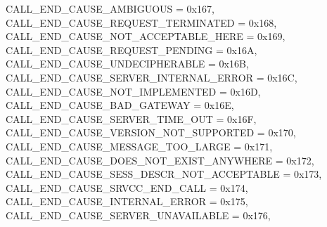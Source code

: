 \begin{DoxyItemize}
 C\+A\+L\+L\+\_\+\+E\+N\+D\+\_\+\+C\+A\+U\+S\+E\+\_\+\+A\+M\+B\+I\+G\+U\+O\+US = 0x167,~\newline
 C\+A\+L\+L\+\_\+\+E\+N\+D\+\_\+\+C\+A\+U\+S\+E\+\_\+\+R\+E\+Q\+U\+E\+S\+T\+\_\+\+T\+E\+R\+M\+I\+N\+A\+T\+ED = 0x168,~\newline
 C\+A\+L\+L\+\_\+\+E\+N\+D\+\_\+\+C\+A\+U\+S\+E\+\_\+\+N\+O\+T\+\_\+\+A\+C\+C\+E\+P\+T\+A\+B\+L\+E\+\_\+\+H\+E\+RE = 0x169,~\newline
 C\+A\+L\+L\+\_\+\+E\+N\+D\+\_\+\+C\+A\+U\+S\+E\+\_\+\+R\+E\+Q\+U\+E\+S\+T\+\_\+\+P\+E\+N\+D\+I\+NG = 0x16A,~\newline
 C\+A\+L\+L\+\_\+\+E\+N\+D\+\_\+\+C\+A\+U\+S\+E\+\_\+\+U\+N\+D\+E\+C\+I\+P\+H\+E\+R\+A\+B\+LE = 0x16B,~\newline
 C\+A\+L\+L\+\_\+\+E\+N\+D\+\_\+\+C\+A\+U\+S\+E\+\_\+\+S\+E\+R\+V\+E\+R\+\_\+\+I\+N\+T\+E\+R\+N\+A\+L\+\_\+\+E\+R\+R\+OR = 0x16C,~\newline
 C\+A\+L\+L\+\_\+\+E\+N\+D\+\_\+\+C\+A\+U\+S\+E\+\_\+\+N\+O\+T\+\_\+\+I\+M\+P\+L\+E\+M\+E\+N\+T\+ED = 0x16D,~\newline
 C\+A\+L\+L\+\_\+\+E\+N\+D\+\_\+\+C\+A\+U\+S\+E\+\_\+\+B\+A\+D\+\_\+\+G\+A\+T\+E\+W\+AY = 0x16E,~\newline
 C\+A\+L\+L\+\_\+\+E\+N\+D\+\_\+\+C\+A\+U\+S\+E\+\_\+\+S\+E\+R\+V\+E\+R\+\_\+\+T\+I\+M\+E\+\_\+\+O\+UT = 0x16F,~\newline
 C\+A\+L\+L\+\_\+\+E\+N\+D\+\_\+\+C\+A\+U\+S\+E\+\_\+\+V\+E\+R\+S\+I\+O\+N\+\_\+\+N\+O\+T\+\_\+\+S\+U\+P\+P\+O\+R\+T\+ED = 0x170,~\newline
 C\+A\+L\+L\+\_\+\+E\+N\+D\+\_\+\+C\+A\+U\+S\+E\+\_\+\+M\+E\+S\+S\+A\+G\+E\+\_\+\+T\+O\+O\+\_\+\+L\+A\+R\+GE = 0x171,~\newline
 C\+A\+L\+L\+\_\+\+E\+N\+D\+\_\+\+C\+A\+U\+S\+E\+\_\+\+D\+O\+E\+S\+\_\+\+N\+O\+T\+\_\+\+E\+X\+I\+S\+T\+\_\+\+A\+N\+Y\+W\+H\+E\+RE = 0x172,~\newline
 C\+A\+L\+L\+\_\+\+E\+N\+D\+\_\+\+C\+A\+U\+S\+E\+\_\+\+S\+E\+S\+S\+\_\+\+D\+E\+S\+C\+R\+\_\+\+N\+O\+T\+\_\+\+A\+C\+C\+E\+P\+T\+A\+B\+LE = 0x173,~\newline
 C\+A\+L\+L\+\_\+\+E\+N\+D\+\_\+\+C\+A\+U\+S\+E\+\_\+\+S\+R\+V\+C\+C\+\_\+\+E\+N\+D\+\_\+\+C\+A\+LL = 0x174,~\newline
 C\+A\+L\+L\+\_\+\+E\+N\+D\+\_\+\+C\+A\+U\+S\+E\+\_\+\+I\+N\+T\+E\+R\+N\+A\+L\+\_\+\+E\+R\+R\+OR = 0x175,~\newline
 C\+A\+L\+L\+\_\+\+E\+N\+D\+\_\+\+C\+A\+U\+S\+E\+\_\+\+S\+E\+R\+V\+E\+R\+\_\+\+U\+N\+A\+V\+A\+I\+L\+A\+B\+LE = 0x176,~\newline

\end{DoxyItemize}
